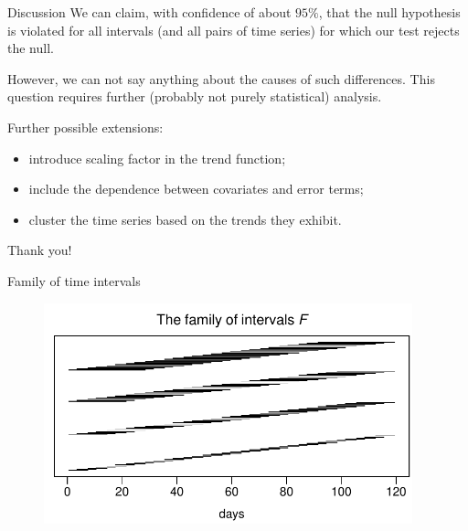 \documentclass[10pt]{beamer}
\begin{document}


\begin{frame}{Discussion}
We can claim, with confidence of about $95\%$, that the null hypothesis is violated for all intervals (and all pairs of time series) for which our test rejects the null. \pause

However, we can not say anything about the causes of such differences. This question requires further (probably not purely statistical) analysis.\pause

Further possible extensions:
\vspace{-1mm}
\begin{itemize}
	\item introduce scaling factor in the trend function;\pause
	\item include the dependence between covariates and error terms;\pause
	\item cluster the time series based on the trends they exhibit.
\end{itemize}
\end{frame}

\begin{frame}[standout]
  Thank you!
\end{frame}


\appendix

\begin{frame}{Family of time intervals}
	\begin{figure}
		\includegraphics[width=0.95\textwidth]{plots/all_intervals}
	\end{figure}
\end{frame}
\end{document}
